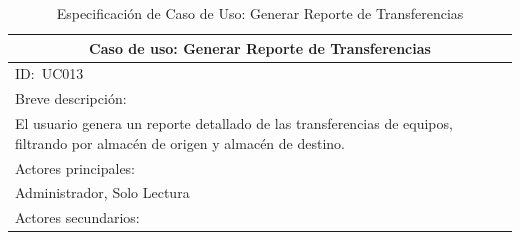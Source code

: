 \documentclass[stu, 12pt, letterpaper, donotrepeattitle, floatsintext, natbib]{apa7}
\begin{document}
\begin{longtable}{@{} p{16.5cm} @{}}
    \caption{Especificación de Caso de Uso: Generar Reporte de Transferencias}\label{tab:UC013}                                                                                                                                                                                       \\ \toprule
    \multicolumn{1}{c}{Caso de uso: Generar Reporte de Transferencias}                                                                                                                                                                                                                \\ \midrule
    ID:~UC013                                                                                                                                                                                                                                                                         \\ \midrule
    Breve descripción:                                                                                                                                                                                                                                                                \\
    El usuario genera un reporte detallado de las transferencias de equipos, filtrando por almacén de origen y almacén de destino.                                                                                                                                                    \\ \midrule
    Actores principales:                                                                                                                                                                                                                                                              \\
    Administrador, Solo Lectura                                                                                                                                                                                                                                                       \\ \midrule
    Actores secundarios:                                                                                                                                                                                                                                                              \\

\end{longtable}
\end{document}

